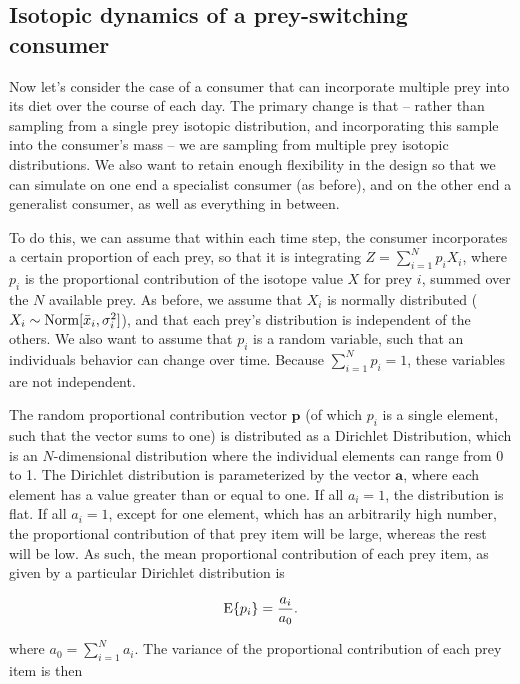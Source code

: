 \documentclass[11pt]{article}
\begin{document}
\subsection{Isotopic dynamics of a prey-switching consumer}

Now let's consider the case of a consumer that can incorporate multiple prey into its diet over the course of each day.
The primary change is that -- rather than sampling from a single prey isotopic distribution, and incorporating this sample into the consumer's mass -- we are sampling from multiple prey isotopic distributions.
We also want to retain enough flexibility in the design so that we can simulate on one end a specialist consumer (as before), and on the other end a generalist consumer, as well as everything in between.

To do this, we can assume that within each time step, the consumer incorporates a certain proportion of each prey, so that it is integrating $Z = \sum_{i=1}^Np_iX_i$, where $p_i$ is the proportional contribution of the isotope value $X$ for prey $i$, summed over the $N$ available prey.
As before, we assume that $X_i$ is normally distributed ($X_i \sim {\rm Norm}[\bar{x}_i, \sigma_i^2]$), and that each prey's distribution is independent of the others.
We also want to assume that $p_i$ is a random variable, such that an individuals behavior can change over time.
Because $\sum_{i=1}^N p_i = 1$, these variables are not independent.

The random proportional contribution vector $\bm p$ (of which $p_i$ is a single element, such that the vector sums to one) is distributed as a Dirichlet Distribution, which is an $N$-dimensional distribution where the individual elements can range from 0 to 1.
The Dirichlet distribution is parameterized by the vector $\bm a$, where each element has a value greater than or equal to one.
If all $a_i = 1$, the distribution is flat.
If all $a_i = 1$, except for one element, which has an arbitrarily high number, the proportional contribution of that prey item will be large, whereas the rest will be low.
As such, the mean proportional contribution of each prey item, as given by a particular Dirichlet distribution is

\begin{equation}
	{\rm E}\{p_i\} = \frac{a_i}{a_0}.
\end{equation}

\noindent where $a_0 = \sum_{i=1}^N a_i$.
The variance of the proportional contribution of each prey item is then
\end{document}
